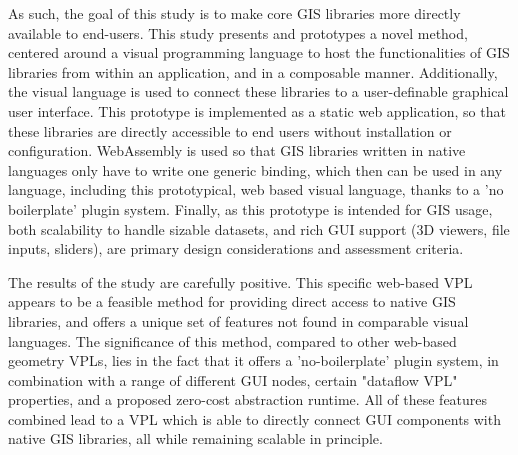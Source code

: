 As such, the goal of this study is to make core GIS libraries more directly available to end-users.
This study presents and prototypes a novel method, centered around a visual programming language to host the functionalities of GIS libraries from within an application, and in a composable manner. 
Additionally, the visual language is used to connect these libraries to a user-definable graphical user interface. 
This prototype is implemented as a static web application, so that these libraries are directly accessible to end users without installation or configuration. 
WebAssembly is used so that GIS libraries written in native languages only have to write one generic binding, which then can be used in any language, including this prototypical, web based visual language, thanks to a 'no boilerplate' plugin system. 
Finally, as this prototype is intended for GIS usage, both scalability to handle sizable datasets, and rich GUI support (3D viewers, file inputs, sliders), are primary design considerations and assessment criteria.

The results of the study are carefully positive. 
This specific web-based VPL appears to be a feasible method for providing direct access to native \ac{GIS} libraries, and offers a unique set of features not found in comparable visual languages. 
The significance of this method, compared to other web-based geometry VPLs, lies in the fact that it offers a 'no-boilerplate' plugin system, in combination with a range of different \ac{GUI} nodes, certain "dataflow VPL" properties, and a proposed zero-cost abstraction runtime. 
All of these features combined lead to a VPL which is able to directly connect \ac{GUI} components with native \ac{GIS} libraries, all while remaining scalable in principle.

